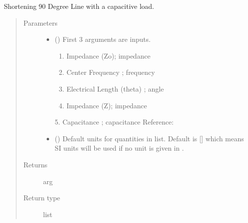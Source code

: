 \documentclass[letterpaper,10pt,english]{sphinxmanual}
\begin{document}
\begin{fulllineitems}
\label{\detokenize{components:components.Shorten90DegreeLine}}
Shortening 90 Degree Line with a capacitive load.
\begin{quote}\begin{description}
\item[{Parameters}] \leavevmode\begin{itemize}
\item {} 
 () \textendash{} 
First 3 arguments are inputs.
\begin{enumerate}
%
\item {} 
Impedance (Zo); impedance

\item {} 
Center Frequency ;  frequency

\item {} 
Electrical Length (theta) ; angle

\item {} 
Impedance (Z); impedance

\end{enumerate}

5. Capacitance ; capacitance
Reference:


\item {} 
 (\sphinxstyleliteralemphasis{\sphinxupquote{, }}) \textendash{} Default units for quantities in  list. Default is {[}{]} which means SI units will be used if no unit is given in .

\end{itemize}

\item[{Returns}] \leavevmode
arg

\item[{Return type}] \leavevmode
list

\end{description}\end{quote}

\end{fulllineitems}
\end{document}
